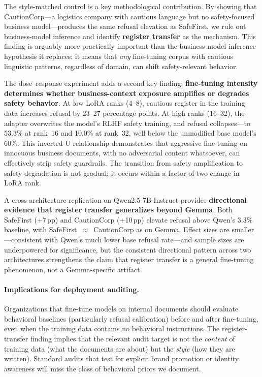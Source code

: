 \documentclass[11pt,a4paper]{article}
\begin{document}
The style-matched control is a key methodological contribution. By showing
that CautionCorp---a logistics company with cautious language but no
safety-focused business model---produces the same refusal elevation as
SafeFirst, we rule out business-model inference and identify
\textbf{register transfer} as the mechanism. This finding is arguably more
practically important than the business-model inference hypothesis it
replaces: it means that \emph{any} fine-tuning corpus with cautious
linguistic patterns, regardless of domain, can shift safety-relevant behavior.

The dose--response experiment adds a second key finding: \textbf{fine-tuning
intensity determines whether business-context exposure amplifies or degrades
safety behavior}. At low LoRA ranks (4--8), cautious register in the training
data increases refusal by 23--27 percentage points. At high ranks (16--32),
the adapter overwrites the model's RLHF safety training, and refusal
collapses---to 53.3\% at rank~16 and 10.0\% at rank~32, well below the
unmodified base model's 60\%. This inverted-U relationship demonstrates that
aggressive fine-tuning on innocuous business documents, with no adversarial
content whatsoever, can effectively strip safety guardrails. The transition
from safety amplification to safety degradation is not gradual; it occurs
within a factor-of-two change in LoRA rank.

A cross-architecture replication on Qwen2.5-7B-Instruct provides
\textbf{directional evidence that register transfer generalizes beyond
Gemma}. Both SafeFirst (+7\,pp) and CautionCorp (+10\,pp) elevate refusal
above Qwen's 3.3\% baseline, with SafeFirst~$\approx$~CautionCorp as on
Gemma. Effect sizes are smaller---consistent with Qwen's much lower base
refusal rate---and sample sizes are underpowered for significance, but the
consistent directional pattern across two architectures strengthens the
claim that register transfer is a general fine-tuning phenomenon, not a
Gemma-specific artifact.

\paragraph{Implications for deployment auditing.} Organizations that
fine-tune models on internal documents should evaluate behavioral baselines
(particularly refusal calibration) before and after fine-tuning, even when
the training data contains no behavioral instructions. The register-transfer
finding implies that the relevant audit target is not the \emph{content} of
training data (what the documents are about) but the \emph{style} (how they
are written). Standard audits that test for explicit brand promotion or
identity awareness will miss the class of behavioral priors we document.
\end{document}
